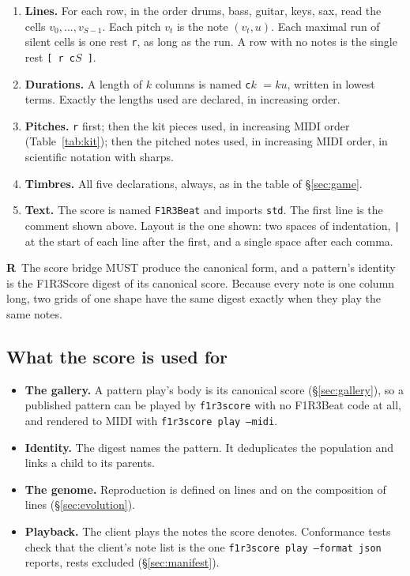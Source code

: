 \documentclass[11pt,a4paper]{article}
\newcommand{\code}[1]{\texttt{#1}}
\newcommand{\MUST}{\textsc{must}}
\newcounter{req}
\newcommand{\req}[1]{\refstepcounter{req}\label{#1}\textbf{R\thereq}}
\renewcommand{\MUST}{{\fontsize{0.82em}{1em}\selectfont MUST}}
\begin{document}
\begin{enumerate}[leftmargin=1.4em,itemsep=2pt]
\item \textbf{Lines.} For each row, in the order drums, bass, guitar, keys, sax, read the cells
  $v_0,\dots,v_{S-1}$. Each pitch $v_t$ is the note $(v_t,u)$. Each maximal run of silent cells
  is one rest \code{r}, as long as the run. A row with no notes is the single rest
  \code{[ r c$S$ ]}.
\item \textbf{Durations.} A length of $k$ columns is named \code{c$k$} $=ku$, written in
  lowest terms. Exactly the lengths used are declared, in increasing order.
\item \textbf{Pitches.} \code{r} first; then the kit pieces used, in increasing MIDI
  order (Table~\ref{tab:kit}); then the pitched notes used, in increasing MIDI order, in scientific
  notation with sharps.
\item \textbf{Timbres.} All five declarations, always, as in the table of \S\ref{sec:game}.
\item \textbf{Text.} The score is named \code{F1R3Beat} and imports \code{std}. The first line
  is the comment shown above. Layout is the one shown: two spaces of indentation, \code{|} at
  the start of each line after the first, and a single space after each comma.
\end{enumerate}

\req{r:canon}~The score bridge \MUST{} produce the canonical form, and a pattern's identity is
the F1R3Score digest of its canonical score. Because every note is one column long, two grids of
one shape have the same digest exactly when they play the same notes.

\subsection{What the score is used for}

\begin{itemize}[leftmargin=1.2em,itemsep=2pt]
\item \textbf{The gallery.} A pattern play's body is its canonical score (\S\ref{sec:gallery}),
  so a published pattern can be played by \code{f1r3score} with no F1R3Beat code at all, and
  rendered to MIDI with \code{f1r3score play --midi}.
\item \textbf{Identity.} The digest names the pattern. It deduplicates the population and
  links a child to its parents.
\item \textbf{The genome.} Reproduction is defined on lines and on the composition of lines
  (\S\ref{sec:evolution}).
\item \textbf{Playback.} The client plays the notes the score denotes. Conformance tests check
  that the client's note list is the one \code{f1r3score play --format json} reports, rests
  excluded (\S\ref{sec:manifest}).
\end{itemize}
\end{document}
